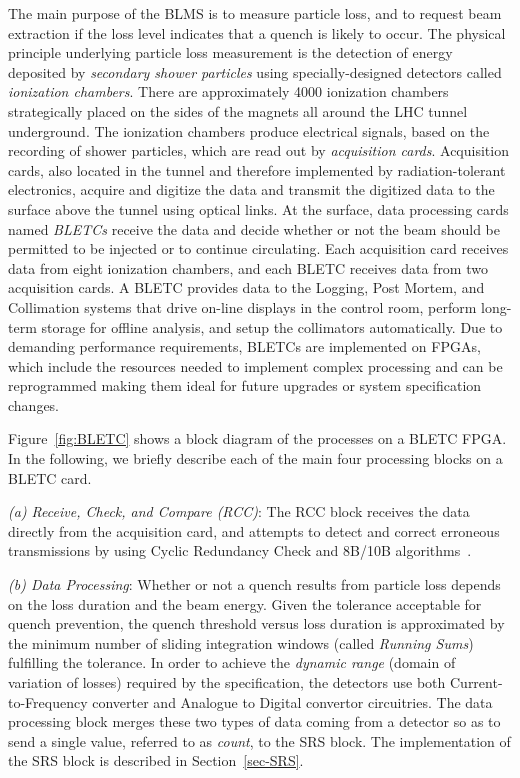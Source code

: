 \documentclass{llncs}
\begin{document}
The main purpose of the BLMS is to measure particle loss, and to request beam extraction if the loss level indicates that a quench is likely to occur.
The physical principle underlying particle loss measurement \cite{Dehning-IPAC,Chris-FPGA} is the detection of energy deposited by \emph{secondary shower particles} using specially-designed detectors called  \emph{ionization chambers}.
There are approximately 4000 ionization chambers strategically placed on the sides of the magnets all around the LHC tunnel underground.
The ionization chambers produce electrical signals, based on the recording of shower particles, which are read out by \emph{acquisition cards}.
Acquisition cards, also located in the tunnel and therefore implemented by radiation-tolerant electronics, acquire and digitize the data and transmit the digitized data to the surface above the tunnel using optical links.
At the surface, data processing cards named \emph{BLETCs} receive the data and decide whether or not the beam should be permitted to be injected or to continue circulating.
Each acquisition card receives data from eight ionization chambers, and each BLETC receives data from two acquisition cards.
A BLETC provides data to the Logging, Post Mortem, and Collimation systems that drive on-line displays in the control room, perform long-term storage for offline analysis, and setup the collimators automatically.
Due to demanding performance requirements, BLETCs are implemented on FPGAs, which include the resources needed to implement complex processing and can be reprogrammed making them ideal for future upgrades or system specification changes.

Figure~\ref{fig:BLETC} shows a block diagram of the processes on a BLETC FPGA.
In the following, we briefly describe each of the main four processing blocks on a BLETC card.

\emph{(a) Receive, Check, and Compare (RCC)}: The RCC block receives the data directly from the acquisition card, and attempts to detect and correct erroneous transmissions by using Cyclic Redundancy Check and 8B/10B algorithms~\cite{CRC,8B10B}.

\emph{(b) Data Processing}: Whether or not a quench results from particle loss depends on the loss duration and the beam energy.
Given the tolerance acceptable for quench prevention, the quench threshold versus loss duration is approximated by the minimum number of sliding integration windows (called \emph{Running Sums}) fulfilling the tolerance.
In order to achieve the \emph{dynamic range} (domain of variation of losses) required by the specification, the detectors use both Current-to-Frequency converter and Analogue to Digital convertor circuitries.
The data processing block merges these two types of data coming from a detector so as to send a single value, referred to as \emph{count}, to the SRS block.
The implementation of the SRS block is described in Section~\ref{sec-SRS}.
\end{document}
